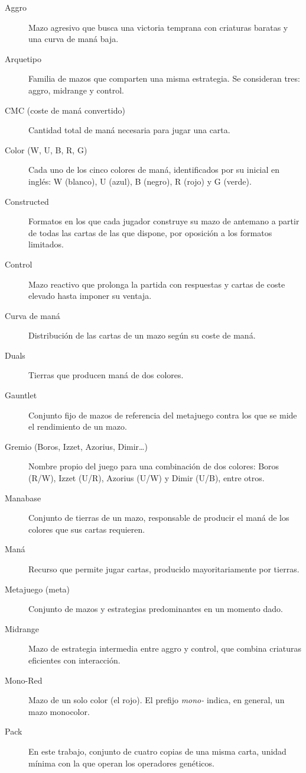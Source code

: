 \begin{description}
    \item[Aggro] Mazo agresivo que busca una victoria temprana con criaturas baratas y una curva de maná baja.
    \item[Arquetipo] Familia de mazos que comparten una misma estrategia. Se consideran tres: aggro, midrange y control.
    \item[CMC (coste de maná convertido)] Cantidad total de maná necesaria para jugar una carta.
    \item[Color (W, U, B, R, G)] Cada uno de los cinco colores de maná, identificados por su inicial en inglés: W (blanco), U (azul), B (negro), R (rojo) y G (verde).
    \item[Constructed] Formatos en los que cada jugador construye su mazo de antemano a partir de todas las cartas de las que dispone, por oposición a los formatos limitados.
    \item[Control] Mazo reactivo que prolonga la partida con respuestas y cartas de coste elevado hasta imponer su ventaja.
    \item[Curva de maná] Distribución de las cartas de un mazo según su coste de maná.
    \item[Duals] Tierras que producen maná de dos colores.
    \item[Gauntlet] Conjunto fijo de mazos de referencia del metajuego contra los que se mide el rendimiento de un mazo.
    \item[Gremio (Boros, Izzet, Azorius, Dimir\ldots)] Nombre propio del juego para una combinación de dos colores: Boros (R/W), Izzet (U/R), Azorius (U/W) y Dimir (U/B), entre otros.
    \item[Manabase] Conjunto de tierras de un mazo, responsable de producir el maná de los colores que sus cartas requieren.
    \item[Maná] Recurso que permite jugar cartas, producido mayoritariamente por tierras.
    \item[Metajuego (meta)] Conjunto de mazos y estrategias predominantes en un momento dado.
    \item[Midrange] Mazo de estrategia intermedia entre aggro y control, que combina criaturas eficientes con interacción.
    \item[Mono-Red] Mazo de un solo color (el rojo). El prefijo \emph{mono-} indica, en general, un mazo monocolor.
    \item[Pack] En este trabajo, conjunto de cuatro copias de una misma carta, unidad mínima con la que operan los operadores genéticos.

\end{description}
